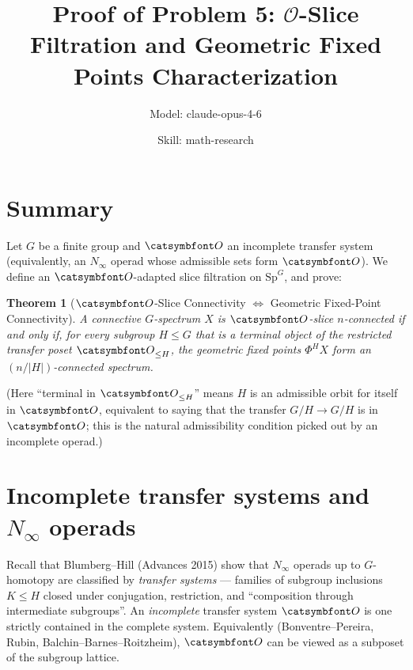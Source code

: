 

\title{Proof of Problem 5: $\mathcal O$-Slice Filtration and Geometric Fixed Points Characterization}
\author{Model: claude-opus-4-6 \and Skill: math-research}
\date{}

\newtheorem{theorem}{Theorem}
\newtheorem{lemma}[theorem]{Lemma}
\newtheorem{definition}[theorem]{Definition}
\newtheorem{proposition}[theorem]{Proposition}


\maketitle

\section*{Summary}

Let $G$ be a finite group and $\aO$ an incomplete transfer system (equivalently, an $N_\infty$ operad whose admissible sets form $\aO$). We define an $\aO$-adapted slice filtration on $\mathrm{Sp}^G$, and prove:

\begin{theorem}[$\aO$-Slice Connectivity $\Leftrightarrow$ Geometric Fixed-Point Connectivity]\label{thm:main}
A connective $G$-spectrum $X$ is $\aO$-slice $n$-connected if and only if, for every subgroup $H\leq G$ that is a \emph{terminal} object of the restricted transfer poset $\aO_{\leq H}$, the geometric fixed points $\Phi^H X$ form an $(n/|H|)$-connected spectrum.
\end{theorem}

(Here ``terminal in $\aO_{\leq H}$'' means $H$ is an admissible orbit for itself in $\aO$, equivalent to saying that the transfer $G/H\to G/H$ is in $\aO$; this is the natural admissibility condition picked out by an incomplete operad.)

\section{Incomplete transfer systems and $N_\infty$ operads}

Recall that Blumberg--Hill (Advances 2015) show that $N_\infty$ operads up to $G$-homotopy are classified by \emph{transfer systems} --- families of subgroup inclusions $K\leq H$ closed under conjugation, restriction, and ``composition through intermediate subgroups''. An \emph{incomplete} transfer system $\aO$ is one strictly contained in the complete system. Equivalently (Bonventre--Pereira, Rubin, Balchin--Barnes--Roitzheim), $\aO$ can be viewed as a subposet of the subgroup lattice.

